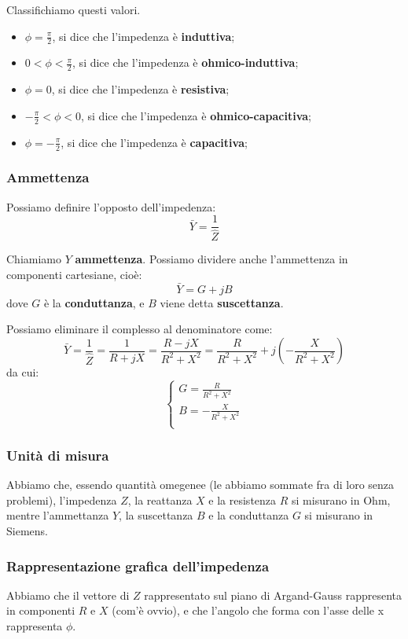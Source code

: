 \documentclass[a4paper,11pt]{article}
\begin{document}
Classifichiamo questi valori.
\begin{itemize}
	\item $\phi = \frac{\pi}{2}$, si dice che l'impedenza è \textbf{induttiva};
	\item $0 < \phi < \frac{\pi}{2}$, si dice che l'impedenza è \textbf{ohmico-induttiva};
	\item $\phi = 0$, si dice che l'impedenza è \textbf{resistiva};
	\item $-\frac{\pi}{2} < \phi < 0$, si dice che l'impedenza è \textbf{ohmico-capacitiva}; 
	\item $\phi = -\frac{\pi}{2}$, si dice che l'impedenza è \textbf{capacitiva};
\end{itemize}

\subsubsection{Ammettenza}
Possiamo definire l'opposto dell'impedenza:
$$
\bar{Y} = \frac{1}{\hat{Z}}
$$

Chiamiamo $Y$ \textbf{ammettenza}.
Possiamo dividere anche l'ammettenza in componenti cartesiane, cioè:
$$
\bar{Y} = G + j B
$$
dove $G$ è la \textbf{conduttanza}, e $B$ viene detta \textbf{suscettanza}.

Possiamo eliminare il complesso al denominatore come:
$$
\bar{Y} = \frac{1}{\hat{Z}} = \frac{1}{R + jX} = \frac{R - jX}{R^2 + X^2} = \frac{R}{R^2 + X^2} + j \left(-\frac{X}{R^2 + X^2}\right)
$$
da cui:
\[
	\begin{cases}
		G = \frac{R}{R^2 + X^2} \\ 	
		B = -\frac{X}{R^2 + X^2} \\ 	
	\end{cases}
\]

\subsubsection{Unità di misura}
Abbiamo che, essendo quantità omegenee (le abbiamo sommate fra di loro senza problemi), l'impedenza $Z$, la reattanza $X$ e la resistenza $R$ si misurano in Ohm, mentre l'ammettanza $Y$, la suscettanza $B$ e la conduttanza $G$ si misurano in Siemens.

\subsubsection{Rappresentazione grafica dell'impedenza}
Abbiamo che il vettore di $Z$ rappresentato sul piano di Argand-Gauss rappresenta in componenti $R$ e $X$ (com'è ovvio), e che l'angolo che forma con l'asse delle x rappresenta $\phi$.
\end{document}
